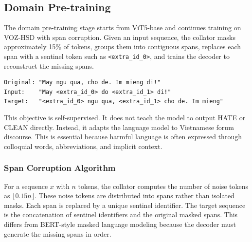 \documentclass[journal]{IEEEtran}
\begin{document}
\subsection{Domain Pre-training}
The domain pre-training stage starts from ViT5-base and continues training on VOZ-HSD with span corruption. Given an input sequence, the collator masks approximately 15\% of tokens, groups them into contiguous spans, replaces each span with a sentinel token such as \texttt{<extra\_id\_0>}, and trains the decoder to reconstruct the missing spans.

\begin{lstlisting}[style=code,caption={Simplified span corruption objective.},label={lst:span}]
Original: "May ngu qua, cho de. Im mieng di!"
Input:    "May <extra_id_0> do <extra_id_1> di!"
Target:   "<extra_id_0> ngu qua, <extra_id_1> cho de. Im mieng"
\end{lstlisting}

This objective is self-supervised. It does not teach the model to output HATE or CLEAN directly. Instead, it adapts the language model to Vietnamese forum discourse. This is essential because harmful language is often expressed through colloquial words, abbreviations, and implicit context.

\subsubsection{Span Corruption Algorithm}
For a sequence $x$ with $n$ tokens, the collator computes the number of noise tokens as $\lfloor 0.15n \rfloor$. These noise tokens are distributed into spans rather than isolated masks. Each span is replaced by a unique sentinel identifier. The target sequence is the concatenation of sentinel identifiers and the original masked spans. This differs from BERT-style masked language modeling because the decoder must generate the missing spans in order.

\begin{table}[!t]
\centering
\caption{Main functions involved in span corruption.}
\label{tab:spancode}
\end{table}
\end{document}
